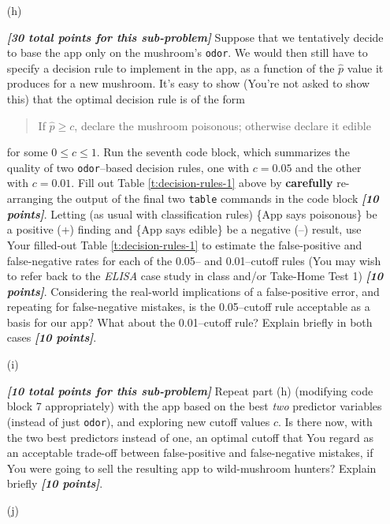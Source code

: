 \documentclass[12pt]{article}
\newcommand{\bi}[1]{\textbf{\textit{#1}}}
\begin{document}
\begin{itemize}
\item[(h)]

\bi{[30 total points for this sub-problem]} Suppose that we tentatively decide to base the app only on the mushroom's \texttt{odor}. We would then still have to specify a decision rule to implement in the app, as a function of the $\hat{ p }$ value it produces for a new mushroom. It's easy to show (You're not asked to show this) that the optimal decision rule is of the form

\begin{quote}

If $\hat{ p } \ge c$, declare the mushroom poisonous; otherwise declare it edible

\end{quote}

for some $0 \le c \le 1$. Run the seventh code block, which summarizes the quality of two \texttt{odor}--based decision rules, one with $c = 0.05$ and the other with $c = 0.01$. Fill out Table \ref{t:decision-rules-1} above by \textbf{carefully} re-arranging the output of the final two \texttt{table} commands in the code block \bi{[10 points]}. Letting (as usual with classification rules) \{App says poisonous\} be a positive (+) finding and \{App says edible\} be a negative (--) result, use Your filled-out Table \ref{t:decision-rules-1} to estimate the false-positive and false-negative rates for each of the 0.05-- and 0.01--cutoff rules  (You may wish to refer back to the \textit{ELISA} case study in class and/or Take-Home Test 1) \bi{[10 points]}. Considering the real-world implications of a false-positive error, and repeating for false-negative mistakes, is the 0.05--cutoff rule acceptable as a basis for our app? What about the 0.01--cutoff rule? Explain briefly in both cases \bi{[10 points]}.

\item[(i)]

\bi{[10 total points for this sub-problem]} Repeat part (h) (modifying code block 7 appropriately) with the app based on the best \textit{two} predictor variables (instead of just \texttt{odor}), and exploring new cutoff values $c$. Is there now, with the two best predictors instead of one, an optimal cutoff that You regard as an acceptable trade-off between false-positive and false-negative mistakes, if You were going to sell the resulting app to wild-mushroom hunters? Explain briefly \bi{[10 points]}.

\item[(j)]


\end{itemize}
\end{document}
